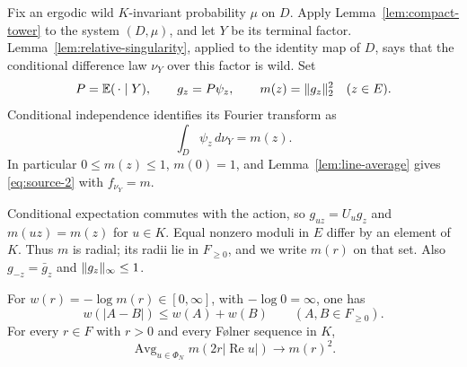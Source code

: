 Fix an ergodic wild $K$-invariant probability $\mu$ on $D$.  Apply
Lemma~\ref{lem:compact-tower} to the system $(D,\mu)$, and let $Y$ be
its terminal factor.  Lemma~\ref{lem:relative-singularity}, applied to
the identity map of $D$, says that the conditional difference law
$\nu_Y$ over this factor is wild.  Set
\begin{equation}\label{eq:rigidity-projected-characters}
 P=\mathbb E(\,\cdot\mid Y),\qquad
 g_z=P\psi_z,\qquad m(z)=\lVert g_z\rVert_2^2\quad(z\in E).
\end{equation}
Conditional independence identifies its Fourier transform as
\begin{equation}\label{eq:rigidity-difference-fourier}
 \int_D\psi_z\,d\nu_Y=m(z).
\end{equation}
In particular $0\leq m(z)\leq1$, $m(0)=1$, and
Lemma~\ref{lem:line-average} gives \eqref{eq:source-2} with
$f_{\nu_Y}=m$.

Conditional expectation commutes with the action, so
$g_{uz}=U_ug_z$ and $m(uz)=m(z)$ for $u\in K$.  Equal nonzero moduli
in $E$ differ by an element of $K$.  Thus $m$ is radial; its radii lie
in $F_{\geq0}$, and we write $m(r)$ on that set.  Also
$g_{-z}=\bar g_z$ and $\lVert g_z\rVert_\infty\leq1$.

\begin{lemma}\label{lem:rigidity-radial}
For $w(r)=-\log m(r)\in[0,\infty]$, with $-\log0=\infty$, one has
\begin{equation}\label{eq:source-8}
 w(|A-B|)\leq w(A)+w(B)\qquad(A,B\in F_{\geq0}).
\end{equation}
For every $r\in F$ with $r>0$ and every F\o lner sequence in $K$,
\begin{equation}\label{eq:source-9}
 \operatorname{Avg}_{u\in\Phi_N}m(2r|\operatorname{Re}u|)
 \longrightarrow m(r)^2.
\end{equation}
\end{lemma}

